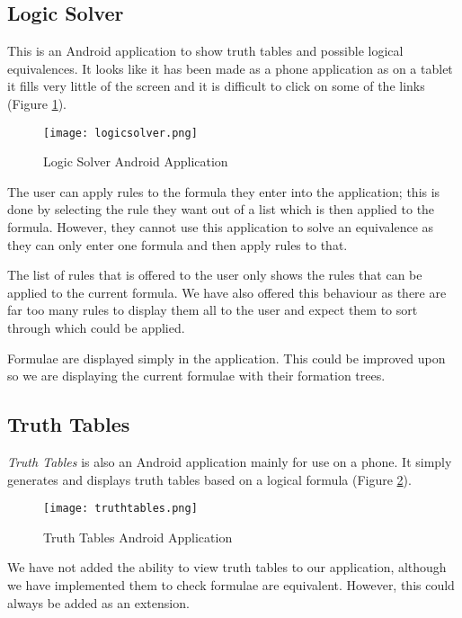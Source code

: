 \documentclass{report}
\begin{document}
\subsection{Logic Solver}

This is an Android application to show truth tables and possible logical equivalences. It looks like it has been made as a phone application as on a tablet it fills very little of the screen and it is difficult to click on some of the links (Figure \ref{logicsolver}).

\begin{figure}[ht!]
    \centering
    \texttt{[image: logicsolver.png]}
    \caption{Logic Solver Android Application}
    \label{logicsolver}
\end{figure}

The user can apply rules to the formula they enter into the application; this is done by selecting the rule they want out of a list which is then applied to the formula. However, they cannot use this application to solve an equivalence as they can only enter one formula and then apply rules to that.

The list of rules that is offered to the user only shows the rules that can be applied to the current formula. We have also offered this behaviour as there are far too many rules to display them all to the user and expect them to sort through which could be applied.

Formulae are displayed simply in the application. This could be improved upon so we are displaying the current formulae with their formation trees.

\subsection{Truth Tables}

\emph{Truth Tables} is also an Android application mainly for use on a phone. It simply generates and displays truth tables based on a logical formula (Figure \ref{truthtables}).

\begin{figure}[ht!]
    \centering
    \texttt{[image: truthtables.png]}
    \caption{Truth Tables Android Application}
    \label{truthtables}
\end{figure}

We have not added the ability to view truth tables to our application, although we have implemented them to check formulae are equivalent. However, this could always be added as an extension.
\end{document}
